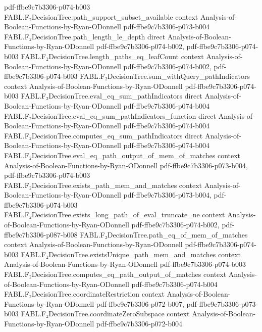 \begin{theorem}
  {pdf-ffbe9c7b3306-p074-b003}
\proofstep
  {FABL.F₂DecisionTree.path_support_subset_available}
  {context}
  {Analysis-of-Boolean-Functions-by-Ryan-ODonnell}
  {pdf-ffbe9c7b3306-p073-b004}
\proofstep
  {FABL.F₂DecisionTree.path_length_le_depth}
  {direct}
  {Analysis-of-Boolean-Functions-by-Ryan-ODonnell}
  {pdf-ffbe9c7b3306-p074-b002,
    pdf-ffbe9c7b3306-p074-b003}
\proofstep
  {FABL.F₂DecisionTree.length_paths_eq_leafCount}
  {context}
  {Analysis-of-Boolean-Functions-by-Ryan-ODonnell}
  {pdf-ffbe9c7b3306-p074-b002,
    pdf-ffbe9c7b3306-p074-b003}
\proofstep
  {FABL.F₂DecisionTree.sum_withQuery_pathIndicators}
  {context}
  {Analysis-of-Boolean-Functions-by-Ryan-ODonnell}
  {pdf-ffbe9c7b3306-p074-b003}
\proofstep
  {FABL.F₂DecisionTree.eval_eq_sum_pathIndicators}
  {direct}
  {Analysis-of-Boolean-Functions-by-Ryan-ODonnell}
  {pdf-ffbe9c7b3306-p074-b004}
\proofstep
  {FABL.F₂DecisionTree.eval_eq_sum_pathIndicators_function}
  {direct}
  {Analysis-of-Boolean-Functions-by-Ryan-ODonnell}
  {pdf-ffbe9c7b3306-p074-b004}
\proofstep
  {FABL.F₂DecisionTree.computes_eq_sum_pathIndicators}
  {direct}
  {Analysis-of-Boolean-Functions-by-Ryan-ODonnell}
  {pdf-ffbe9c7b3306-p074-b004}
\proofstep
  {FABL.F₂DecisionTree.eval_eq_path_output_of_mem_of_matches}
  {context}
  {Analysis-of-Boolean-Functions-by-Ryan-ODonnell}
  {pdf-ffbe9c7b3306-p073-b004,
    pdf-ffbe9c7b3306-p074-b003}
\proofstep
  {FABL.F₂DecisionTree.exists_path_mem_and_matches}
  {context}
  {Analysis-of-Boolean-Functions-by-Ryan-ODonnell}
  {pdf-ffbe9c7b3306-p073-b004,
    pdf-ffbe9c7b3306-p074-b003}
\proofstep
  {FABL.F₂DecisionTree.exists_long_path_of_eval_truncate_ne}
  {context}
  {Analysis-of-Boolean-Functions-by-Ryan-ODonnell}
  {pdf-ffbe9c7b3306-p074-b002,
    pdf-ffbe9c7b3306-p087-b008}
\proofstep
  {FABL.F₂DecisionTree.path_eq_of_mem_of_matches}
  {context}
  {Analysis-of-Boolean-Functions-by-Ryan-ODonnell}
  {pdf-ffbe9c7b3306-p074-b003}
\proofstep
  {FABL.F₂DecisionTree.existsUnique_path_mem_and_matches}
  {context}
  {Analysis-of-Boolean-Functions-by-Ryan-ODonnell}
  {pdf-ffbe9c7b3306-p074-b003}
\proofstep
  {FABL.F₂DecisionTree.computes_eq_path_output_of_matches}
  {context}
  {Analysis-of-Boolean-Functions-by-Ryan-ODonnell}
  {pdf-ffbe9c7b3306-p074-b004}
\proofstep
  {FABL.F₂DecisionTree.coordinateRestriction}
  {context}
  {Analysis-of-Boolean-Functions-by-Ryan-ODonnell}
  {pdf-ffbe9c7b3306-p072-b007,
    pdf-ffbe9c7b3306-p073-b003}
\proofstep
  {FABL.F₂DecisionTree.coordinateZeroSubspace}
  {context}
  {Analysis-of-Boolean-Functions-by-Ryan-ODonnell}
  {pdf-ffbe9c7b3306-p072-b004}
\proofstep

\end{theorem}
